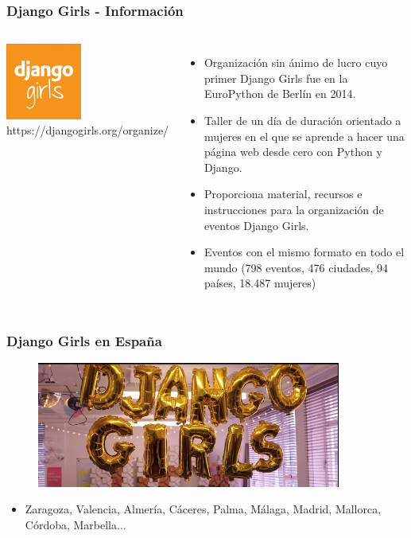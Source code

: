 \documentclass[18pt]{beamer}
\begin{document}
\begin{frame}

	\frametitle{Django Girls - Información}
		
	\begin{columns}
		\centering
			\includegraphics[width=2.5cm]{images/django_girls.jpg}\\
			\vspace{0.5cm}			
			\footnotesize https://djangogirls.org/organize/
			
		\begin{itemize}
			\setlength\itemsep{0.6em}		
			\item Organización sin ánimo de lucro cuyo primer Django Girls fue en la 
			EuroPython de Berlín en 2014.
			\item Taller de un día de duración orientado a mujeres en el que se aprende 
			a hacer una página web desde cero con Python y Django.			
			\item Proporciona material, recursos e instrucciones para la organización 
			de eventos Django Girls.
			\item Eventos con el mismo formato en todo el mundo (798 eventos, 
			476 ciudades, 94 países, 18.487 mujeres)

		\end{itemize}
	\end{columns}
	
\end{frame}


\begin{frame}

	\frametitle{Django Girls en España}
		
	\begin{figure}
		\includegraphics[width=10cm]{images/django_girls_letters.png}
	\end{figure}
	
	\begin{itemize}	
		\setlength\itemsep{0.6em}
		\item Zaragoza, Valencia, Almería, Cáceres, Palma, Málaga, Madrid, Mallorca, 
		Córdoba, Marbella... 
	\end{itemize}
	
\end{frame}
\end{document}
